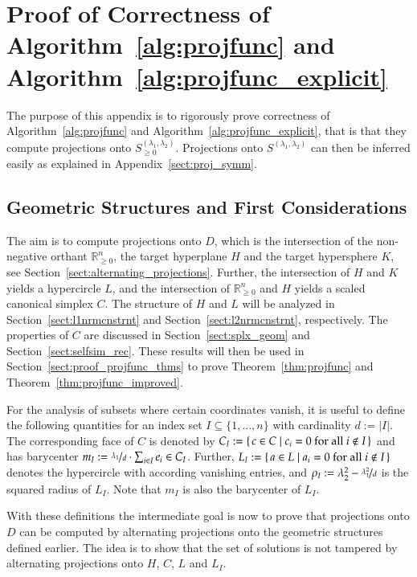 \documentclass[twoside,11pt]{article}
\newcommand{\R}{\mathbb{R}}
\newcommand{\0}{\mathcal{O}}
\newcommand{\abs}[1]{\left\vert #1 \right\vert}
\newcommand{\discint}[2]{\{#1,\dotsc,#2\}}
\begin{document}
\section{Proof of Correctness of Algorithm~\ref{alg:projfunc} and Algorithm~\ref{alg:projfunc_explicit}}
\label{sect:projfuncproof}
The purpose of this appendix is to rigorously prove correctness of Algorithm~\ref{alg:projfunc} and Algorithm~\ref{alg:projfunc_explicit}, that is that they compute projections onto $S_{\geq 0}^{(\lambda_1,\lambda_2)}$.
Projections onto $S^{(\lambda_1,\lambda_2)}$ can then be inferred easily as explained in Appendix~\ref{sect:proj_symm}.

\subsection{Geometric Structures and First Considerations}
\label{sect:geomstruct}
The aim is to compute projections onto $D$, which is the intersection of the non-negative orthant $\R_{\geq 0}^n$, the target hyperplane $H$ and the target hypersphere $K$, see Section~\ref{sect:alternating_projections}.
Further, the intersection of $H$ and $K$ yields a hypercircle $L$, and the intersection of $\R_{\geq 0}^n$ and $H$ yields a scaled canonical simplex $C$.
The structure of $H$ and $L$ will be analyzed in Section~\ref{sect:l1nrmcnstrnt} and Section~\ref{sect:l2nrmcnstrnt}, respectively.
The properties of $C$ are discussed in Section~\ref{sect:splx_geom} and Section~\ref{sect:selfsim_rec}.
These results will then be used in Section~\ref{sect:proof_projfunc_thms} to prove Theorem~\ref{thm:projfunc} and Theorem~\ref{thm:projfunc_improved}.

For the analysis of subsets where certain coordinates vanish, it is useful to define the following quantities for an index set $I\subseteq\discint{1}{n}$ with cardinality $d := \abs{I}$.
The corresponding face of $C$ is denoted by $C_I := \set{c\in C | c_i = 0\text{ for all }i\not\in I}$ and has barycenter $m_I := \nicefrac{\lambda_1}{d}\cdot\sum_{i\in I}e_i\in C_I$.
Further, $L_I := \set{a\in L | a_i = 0\text{ for all }i\not\in I}$ denotes the hypercircle with according vanishing entries, and $\rho_I := \lambda_2^2 - \nicefrac{\lambda_1^2}{d}$ is the squared radius of $L_I$.
Note that $m_I$ is also the barycenter of $L_I$.

With these definitions the intermediate goal is now to prove that projections onto $D$ can be computed by alternating projections onto the geometric structures defined earlier.
The idea is to show that the set of solutions is not tampered by alternating projections onto $H$, $C$, $L$ and $L_I$.
\end{document}
